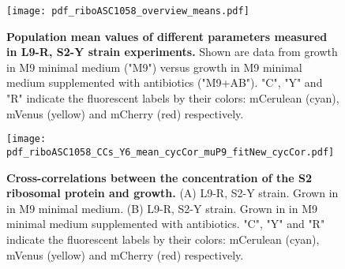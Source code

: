 \begin{figure}
    \centering
    \texttt{[image: pdf\_riboASC1058\_overview\_means.pdf]}
    \caption{ 
        \textbf{Population mean values of different parameters measured in L9-R, S2-Y strain experiments.}
        Shown are data from growth in M9 minimal medium ("M9") versus growth in M9 minimal medium supplemented with antibiotics ("M9+AB").
        "C", "Y" and "R" indicate the fluorescent labels by their colors: mCerulean (cyan), mVenus (yellow) and mCherry (red) respectively.
    }
    \label{fig:ribo:meansRR}
\end{figure}


\begin{figure}
    \centering
    \texttt{[image: pdf\_riboASC1058\_CCs\_Y6\_mean\_cycCor\_muP9\_fitNew\_cycCor.pdf]}
    \caption{ 
        \textbf{Cross-correlations between the concentration of the S2 ribosomal protein and growth.}
        (A) L9-R, S2-Y strain. Grown in in M9 minimal medium.
        (B) L9-R, S2-Y strain. Grown in in M9 minimal medium supplemented with antibiotics. 
        "C", "Y" and "R" indicate the fluorescent labels by their colors: mCerulean (cyan), mVenus (yellow) and mCherry (red) respectively.
    }
    \label{fig:ribo:CCsEmuS2}
\end{figure}

